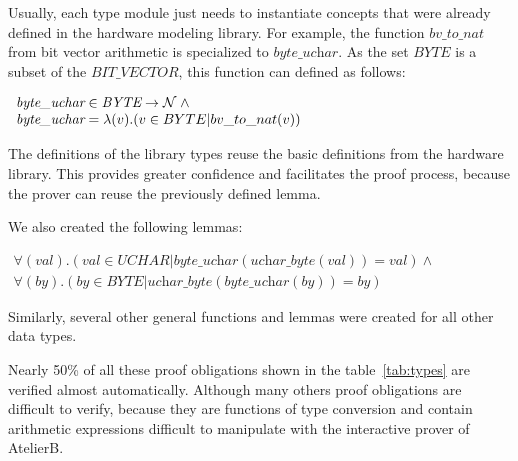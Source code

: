 \documentclass[a4paper]{llncs}
\begin{document}
Usually, each type module just needs to instantiate concepts that were already defined in the hardware
modeling library.  For example, the function $\textit{bv\_to\_nat}$ from bit vector arithmetic is
specialized to $\textit{byte\_uchar}$. As the set $\textit{BYTE}$ is a subset of the
$\textit{BIT\_VECTOR}$, this function can defined as follows:


$
\begin{array}{l}
\textit{byte\_uchar} \in \textit{BYTE} \fun \nat \land \\
\textit{byte\_uchar} = \lambda (v) . ( v \in BYTE | bv\_to\_nat(v) )
\end{array}
$

The definitions of the library types reuse the basic definitions from the hardware library. This provides
greater confidence and facilitates the proof process, because the prover can reuse the previously defined
lemma.


%

 We also created the following lemmas:
 
 $
 \begin{array}{l}
  \forall (val) . (val \in \textit{UCHAR} |
  \textit{byte\_uchar}(\textit{uchar\_byte}(val)) = val) \land\\
  \forall (by) . (by \in \textit{BYTE} |
  \textit{uchar\_byte}(\textit{byte\_uchar}(by)) = by)
 \end{array}
 $

Similarly, several other general functions and lemmas were created for all other data types.

Nearly 50\% of all these proof obligations shown in the table~\ref{tab:types} 
are verified almost automatically. Although many others proof obligations are difficult to verify,
because they are functions of type conversion and contain arithmetic expressions difficult 
to manipulate with the interactive prover of AtelierB.
\end{document}
